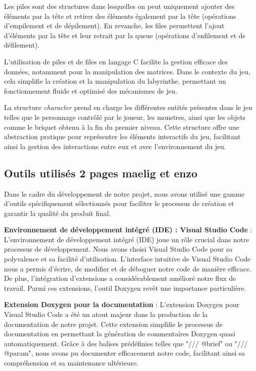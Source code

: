 \documentclass[10pt]{article}
\begin{document}
Les piles sont des structures dans lesquelles on peut uniquement ajouter des éléments par la tête et retirer des éléments également par la tête (opérations d'empilement et de dépilement). En revanche, les files permettent l'ajout d'éléments par la tête et leur retrait par la queue (opérations d'enfilement et de défilement).

L'utilisation de piles et de files en langage C facilite la gestion efficace des données, notamment pour la manipulation des matrices. Dans le contexte du jeu, cela simplifie la création et la manipulation du labyrinthe, permettant un fonctionnement fluide et optimisé des mécanismes de jeu.

La structure \textit{character} prend en charge les différentes entités présentes dans le jeu telles que le personnage contrôlé par le joueur, les monstres, ainsi que les objets comme le briquet obtenu à la fin du premier niveau. Cette structure offre une abstraction pratique pour représenter les éléments interactifs du jeu, facilitant ainsi la gestion des interactions entre eux et avec l'environnement du jeu.

\subsection{Outils utilisés 2 pages maelig et enzo}
Dans le cadre du développement de notre projet, nous avons utilisé une gamme d'outils spécifiquement sélectionnés pour faciliter le processus de création et garantir la qualité du produit final.

\textbf{Environnement de développement intégré (IDE) : Visual Studio Code} :
L'environnement de développement intégré (IDE) joue un rôle crucial dans notre processus de développement. Nous avons choisi Visual Studio Code pour sa polyvalence et sa facilité d'utilisation. L'interface intuitive de Visual Studio Code nous a permis d'écrire, de modifier et de déboguer notre code de manière efficace. De plus, l'intégration d'extensions a considérablement amélioré notre flux de travail. Parmi ces extensions, l'outil Doxygen revêt une importance particulière.

\textbf{Extension Doxygen pour la documentation} :
L'extension Doxygen pour Visual Studio Code a été un atout majeur dans la production de la documentation de notre projet. Cette extension simplifie le processus de documentation en permettant la génération de commentaires Doxygen quasi automatiquement. Grâce à des balises prédéfinies telles que "/// @brief" ou "/// @param", nous avons pu documenter efficacement notre code, facilitant ainsi sa compréhension et sa maintenance ultérieure.
\end{document}
